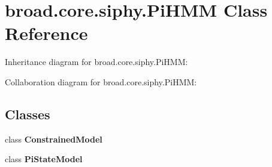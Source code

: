 \hypertarget{classbroad_1_1core_1_1siphy_1_1_pi_h_m_m}{\section{broad.\+core.\+siphy.\+Pi\+H\+M\+M Class Reference}
\label{classbroad_1_1core_1_1siphy_1_1_pi_h_m_m}
}


Inheritance diagram for broad.\+core.\+siphy.\+Pi\+H\+M\+M\+:


Collaboration diagram for broad.\+core.\+siphy.\+Pi\+H\+M\+M\+:
\subsection*{Classes}
\begin{DoxyCompactItemize}
\item 
class {\bfseries Constrained\+Model}
\item 
class {\bfseries Pi\+State\+Model}
\end{DoxyCompactItemize}
